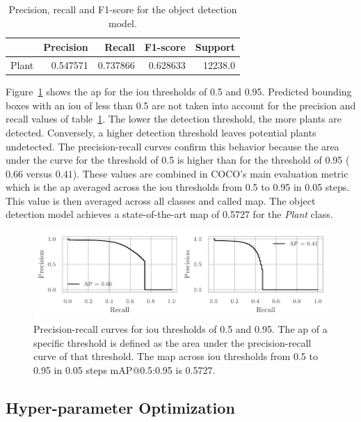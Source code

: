 \documentclass[draft,final]{vutinfth} %
\begin{document}
\begin{table}[h]
  \centering
  \begin{tabular}{lrrrr}
    \toprule
    {} &  Precision &    Recall &  F1-score &  Support \\
    \midrule
    Plant        &   0.547571 &  0.737866 &  0.628633 &  12238.0 \\
    \bottomrule
  \end{tabular}
  \caption{Precision, recall and F1-score for the object detection model.}
  \label{tab:yolo-metrics}
\end{table}

Figure~\ref{fig:yolo-ap} shows the \gls{ap} for the \gls{iou}
thresholds of 0.5 and 0.95. Predicted bounding boxes with an \gls{iou}
of less than 0.5 are not taken into account for the precision and
recall values of table~\ref{tab:yolo-metrics}. The lower the detection
threshold, the more plants are detected. Conversely, a higher
detection threshold leaves potential plants undetected. The
precision-recall curves confirm this behavior because the area under
the curve for the threshold of 0.5 is higher than for the threshold of
0.95 ($0.66$ versus $0.41$). These values are combined in COCO's
\cite{lin2015} main evaluation metric which is the \gls{ap} averaged
across the \gls{iou} thresholds from 0.5 to 0.95 in 0.05 steps. This
value is then averaged across all classes and called \gls{map}. The
object detection model achieves a state-of-the-art \gls{map} of 0.5727
for the \emph{Plant} class.

\begin{figure}
  \centering
  \includegraphics{graphics/APpt5-pt95.pdf}
  \caption[Object detection AP@0.5 and AP@0.95.]{Precision-recall
    curves for \gls{iou} thresholds of 0.5 and 0.95. The \gls{ap} of a
    specific threshold is defined as the area under the
    precision-recall curve of that threshold. The \gls{map} across
    \gls{iou} thresholds from 0.5 to 0.95 in 0.05 steps
    \textsf{mAP}@0.5:0.95 is 0.5727.}
  \label{fig:yolo-ap}
\end{figure}

\subsection{Hyper-parameter Optimization}
\label{ssec:yolo-hyp-opt}
\end{document}
